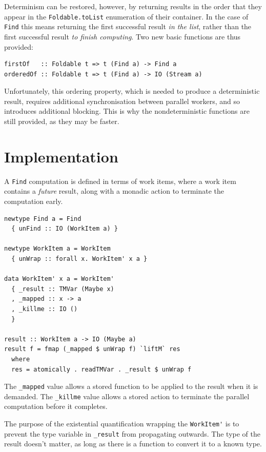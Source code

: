 Determinism can be restored, however, by returning results in the
order that they appear in the \verb|Foldable.toList| enumeration of
their container. In the case of \verb|Find| this means returning the
first successful result \textit{in the list}, rather than the first
successful result \textit{to finish computing}. Two new basic
functions are thus provided:

\begin{verbatim}
firstOf   :: Foldable t => t (Find a) -> Find a
orderedOf :: Foldable t => t (Find a) -> IO (Stream a)
\end{verbatim}

Unfortunately, this ordering property, which is needed to produce a
deterministic result, requires additional synchronisation between
parallel workers, and so introduces additional blocking. This is why
the nondeterministic functions are still provided, as they may be
faster.

\section{Implementation}
\label{sec:searchparty-impl}

A \verb|Find| computation is defined in terms of work items, where a
work item contains a \textit{future} result, along with a monadic
action to terminate the computation early.

\begin{verbatim}
newtype Find a = Find
  { unFind :: IO (WorkItem a) }

newtype WorkItem a = WorkItem
  { unWrap :: forall x. WorkItem' x a }

data WorkItem' x a = WorkItem'
  { _result :: TMVar (Maybe x)
  , _mapped :: x -> a
  , _killme :: IO ()
  }

result :: WorkItem a -> IO (Maybe a)
result f = fmap (_mapped $ unWrap f) `liftM` res
  where
  res = atomically . readTMVar . _result $ unWrap f
\end{verbatim}

The \verb|_mapped| value allows a stored function to be applied
to the result when it is demanded. The \verb|_killme| value allows
a stored action to terminate the parallel computation before it
completes.

The purpose of the existential quantification wrapping the
\verb|WorkItem'| is to prevent the type variable in \verb|_result|
from propagating outwards. The type of the result doesn't matter, as
long as there is a function to convert it to a known type.

